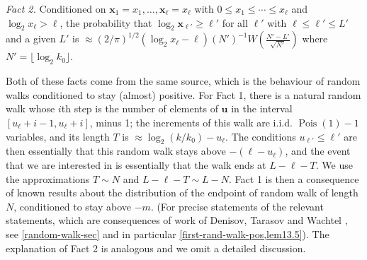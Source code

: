 \documentclass[11pt,reqno]{amsart}
\numberwithin{equation}{section}
\theoremstyle{definition}
\theoremstyle{remark}
\newcommand{\mbf}{\mathbf}
\newcommand\Pois{\operatorname{Pois}}
\renewcommand{\le}{\leqslant}
\renewcommand{\ge}{\geqslant}
\begin{document}
\emph{Fact 2.} Conditioned on $\mbf{x}_1 = x_1, \dots, \mbf{x}_{\ell} = x_{\ell}$ with $0 \le x_1 \le \cdots \le x_{\ell}$ and $\log_2 x_{\ell} > \ell$, the probability that $\log_2 \mbf{x}_{\ell'} \ge \ell'$ for all $\ell'$ with $\ell \le \ell' \le L'$ and a given $L'$ is $\approx (2/\pi)^{1/2} (\log_2 x_{\ell} - \ell) (N')^{-1} W(\frac{N' - L'}{\sqrt{N'}})$ where $N' = \lfloor \log_2 k_0\rfloor$.\vspace*{5pt}

Both of these facts come from the same source, which is the behaviour of random walks conditioned to stay (almost) positive. For Fact 1, there is a natural random walk whose $i$th step is the number of elements of $\mbf{u}$ in the interval $[u_{\ell} + i - 1, u_{\ell} + i]$, minus 1; the increments of this walk are i.i.d. $\Pois(1) - 1$ variables, and its length $T$ is $\approx \log_2(k/k_0) - u_{\ell}$. The conditions $u_{\ell'} \le \ell'$ are then essentially that this random walk stays above $-(\ell - u_\ell)$, and the event that we are interested in is essentially that the walk ends at $L - \ell - T$. We use the approximations $T \sim N$ and $L - \ell - T \sim L - N$. Fact 1 is then a consequence of known results about the distribution of the endpoint of random walk of length $N$, conditioned to stay above $-m$. (For precise statements of the relevant statements, which are consequences of work of Denisov, Tarasov and Wachtel \cite{DTW24b}, see \cref{random-walk-sec} and in particular \cref{first-rand-walk-pos,lem13.5}). The explanation of Fact 2 is analogous and we omit a detailed discussion.
\end{document}
